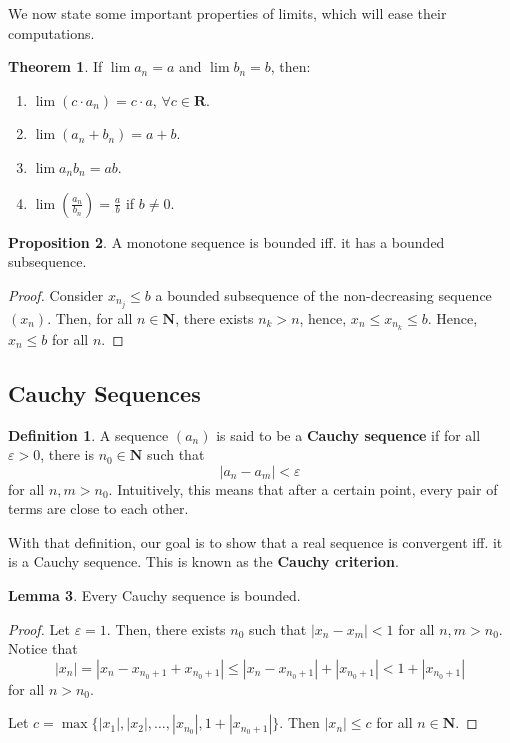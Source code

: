\documentclass[12pt,a4paper]{article}
\theoremstyle{definition}
\newtheorem{theorem}{Theorem}[section]
\newtheorem{lemma}[theorem]{Lemma}
\newtheorem{proposition}[theorem]{Proposition}
\newtheorem{definition}{Definition}[section]
\begin{document}
We now state some important properties of limits, which will ease their computations. 

\begin{theorem}
	If $\lim a_n = a$ and $\lim b_n = b$, then:
	\begin{enumerate}
		\item $\lim (c \cdot a_n) = c \cdot a$, $\forall c \in \textbf{R}$.
		\item $\lim (a_n + b_n) = a + b$.
		\item $\lim a_n b_n = ab$.
		\item $\lim \left( \frac{a_n}{b_n} \right) = \frac{a}{b}$ if $b \neq 0$.
	\end{enumerate}
\end{theorem}

\begin{proposition}
	A monotone sequence is bounded iff. it has a bounded subsequence.
\end{proposition}

\begin{proof}
	Consider $x_{n_j} \leq b$ a bounded subsequence of the non-decreasing sequence $(x_n)$. Then, for all $n \in \textbf{N}$, there exists $n_k > n$, hence, $x_n \leq x_{n_k} \leq b$. Hence, $x_n \leq b$ for all $n$. 
\end{proof}

\subsection{Cauchy Sequences}

\begin{definition}
	A sequence $(a_n)$ is said to be a \textbf{Cauchy sequence} if for all $\varepsilon > 0$, there is $n_0 \in \textbf{N}$ such that 
	\[
		| a_n - a_m | < \varepsilon
	\]
	for all $n,m > n_0$. Intuitively, this means that after a certain point, every pair of terms are close to each other.
\end{definition}

With that definition, our goal is to show that a real sequence is convergent iff. it is a Cauchy sequence. This is known as the \textbf{Cauchy criterion}.

\begin{lemma}
	Every Cauchy sequence is bounded.
\end{lemma}

\begin{proof}
	Let $\varepsilon = 1$. Then, there exists $n_0$ such that $|x_n - x_m| < 1$ for all $n,m > n_0$. Notice that
	\[ |x_n| = |x_n - x_{n_0+1} + x_{n_0+1}| \leq |x_n - x_{n_0+1}| + |x_{n_0+1}| < 1 +  |x_{n_0+1}| \]
	for all $n > n_0$.
	
	Let $c = \max \{|x_1|, |x_2|, \ldots, |x_{n_0}|, 1+|x_{n_0+1}|\}$. Then $|x_n| \leq c$ for all $n \in \textbf{N}$.
\end{proof}
\end{document}
